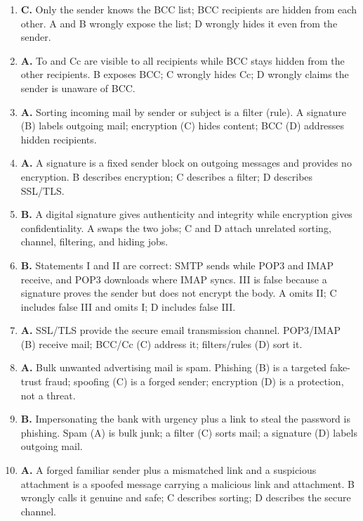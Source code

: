 \documentclass[11pt]{article}
\begin{document}
\begin{enumerate}[label=\textbf{Q\arabic*.}, leftmargin=*]
  of POP3 or IMAP. Sending to the server (A), forwarding between servers
  (B), and carrying the message toward the mailbox (D) are all true of SMTP.
\item \textbf{C.} Only the sender knows the BCC list; BCC recipients are
  hidden from each other. A and B wrongly expose the list; D wrongly hides
  it even from the sender.
\item \textbf{A.} To and Cc are visible to all recipients while BCC stays
  hidden from the other recipients. B exposes BCC; C wrongly hides Cc; D
  wrongly claims the sender is unaware of BCC.
\item \textbf{A.} Sorting incoming mail by sender or subject is a filter
  (rule). A signature (B) labels outgoing mail; encryption (C) hides content;
  BCC (D) addresses hidden recipients.
\item \textbf{A.} A signature is a fixed sender block on outgoing messages
  and provides no encryption. B describes encryption; C describes a filter;
  D describes SSL/TLS.
\item \textbf{B.} A digital signature gives authenticity and integrity while
  encryption gives confidentiality. A swaps the two jobs; C and D attach
  unrelated sorting, channel, filtering, and hiding jobs.
\item \textbf{B.} Statements I and II are correct: SMTP sends while POP3 and
  IMAP receive, and POP3 downloads where IMAP syncs. III is false because a
  signature proves the sender but does not encrypt the body. A omits II; C
  includes false III and omits I; D includes false III.
\item \textbf{A.} SSL/TLS provide the secure email transmission channel.
  POP3/IMAP (B) receive mail; BCC/Cc (C) address it; filters/rules (D) sort
  it.
\item \textbf{A.} Bulk unwanted advertising mail is spam. Phishing (B) is a
  targeted fake-trust fraud; spoofing (C) is a forged sender; encryption (D)
  is a protection, not a threat.
\item \textbf{B.} Impersonating the bank with urgency plus a link to steal
  the password is phishing. Spam (A) is bulk junk; a filter (C) sorts mail;
  a signature (D) labels outgoing mail.
\item \textbf{A.} A forged familiar sender plus a mismatched link and a
  suspicious attachment is a spoofed message carrying a malicious link and
  attachment. B wrongly calls it genuine and safe; C describes sorting; D
  describes the secure channel.


\end{enumerate}
\end{document}
